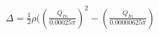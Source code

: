 \documentclass[preview]{standalone}
\begin{document}
\begin{align*}
\Delta  = \frac{1}{2} \rho ((\frac{\dot{Q}_{In}}{0.00025\pi})^2 - (\frac{\dot{Q}_{In}}{0.00000625\pi})
\end{align*}
\end{document}
